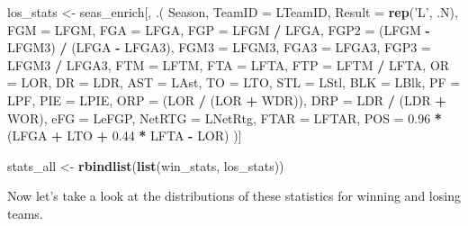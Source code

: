 \documentclass[]{article}
\newenvironment{Shaded}{\begin{snugshade}}{\end{snugshade}}
\newcommand{\KeywordTok}[1]{\textcolor[rgb]{0.13,0.29,0.53}{\textbf{#1}}}
\newcommand{\DataTypeTok}[1]{\textcolor[rgb]{0.13,0.29,0.53}{#1}}
\newcommand{\FloatTok}[1]{\textcolor[rgb]{0.00,0.00,0.81}{#1}}
\newcommand{\StringTok}[1]{\textcolor[rgb]{0.31,0.60,0.02}{#1}}
\newcommand{\OperatorTok}[1]{\textcolor[rgb]{0.81,0.36,0.00}{\textbf{#1}}}
\newcommand{\NormalTok}[1]{#1}
\begin{document}
\begin{Shaded}
\begin{Highlighting}[]
\NormalTok{los_stats <-}\StringTok{ }\NormalTok{seas_enrich[, .(}
\NormalTok{    Season,}
    \DataTypeTok{TeamID =}\NormalTok{ LTeamID,}
    \DataTypeTok{Result =} \KeywordTok{rep}\NormalTok{(}\StringTok{'L'}\NormalTok{, .N),}
    \DataTypeTok{FGM =}\NormalTok{ LFGM,}
    \DataTypeTok{FGA =}\NormalTok{ LFGA,}
    \DataTypeTok{FGP =}\NormalTok{ LFGM }\OperatorTok{/}\StringTok{ }\NormalTok{LFGA,}
    \DataTypeTok{FGP2 =}\NormalTok{ (LFGM }\OperatorTok{-}\StringTok{ }\NormalTok{LFGM3) }\OperatorTok{/}\StringTok{ }\NormalTok{(LFGA }\OperatorTok{-}\StringTok{ }\NormalTok{LFGA3),}
    \DataTypeTok{FGM3 =}\NormalTok{ LFGM3,}
    \DataTypeTok{FGA3 =}\NormalTok{ LFGA3,}
    \DataTypeTok{FGP3 =}\NormalTok{ LFGM3 }\OperatorTok{/}\StringTok{ }\NormalTok{LFGA3,}
    \DataTypeTok{FTM =}\NormalTok{ LFTM,}
    \DataTypeTok{FTA =}\NormalTok{ LFTA,}
    \DataTypeTok{FTP =}\NormalTok{ LFTM }\OperatorTok{/}\StringTok{ }\NormalTok{LFTA,}
    \DataTypeTok{OR =}\NormalTok{ LOR,}
    \DataTypeTok{DR =}\NormalTok{ LDR,}
    \DataTypeTok{AST =}\NormalTok{ LAst,}
    \DataTypeTok{TO =}\NormalTok{ LTO,}
    \DataTypeTok{STL =}\NormalTok{ LStl,}
    \DataTypeTok{BLK =}\NormalTok{ LBlk,}
    \DataTypeTok{PF =}\NormalTok{ LPF,}
    \DataTypeTok{PIE =}\NormalTok{ LPIE,}
    \DataTypeTok{ORP =}\NormalTok{ (LOR }\OperatorTok{/}\StringTok{ }\NormalTok{(LOR }\OperatorTok{+}\StringTok{ }\NormalTok{WDR)),}
    \DataTypeTok{DRP =}\NormalTok{ LDR }\OperatorTok{/}\StringTok{ }\NormalTok{(LDR }\OperatorTok{+}\StringTok{ }\NormalTok{WOR),}
    \DataTypeTok{eFG =}\NormalTok{ LeFGP,}
    \DataTypeTok{NetRTG =}\NormalTok{ LNetRtg,}
    \DataTypeTok{FTAR =}\NormalTok{ LFTAR,}
    \DataTypeTok{POS =} \FloatTok{0.96} \OperatorTok{*}\StringTok{ }\NormalTok{(LFGA }\OperatorTok{+}\StringTok{ }\NormalTok{LTO }\OperatorTok{+}\StringTok{ }\FloatTok{0.44} \OperatorTok{*}\StringTok{ }\NormalTok{LFTA }\OperatorTok{-}\StringTok{ }\NormalTok{LOR)}
\NormalTok{    )]}

\NormalTok{stats_all <-}\StringTok{ }\KeywordTok{rbindlist}\NormalTok{(}\KeywordTok{list}\NormalTok{(win_stats, los_stats))}
\end{Highlighting}
\end{Shaded}

Now let's take a look at the distributions of these statistics for
winning and losing teams.
\end{document}
